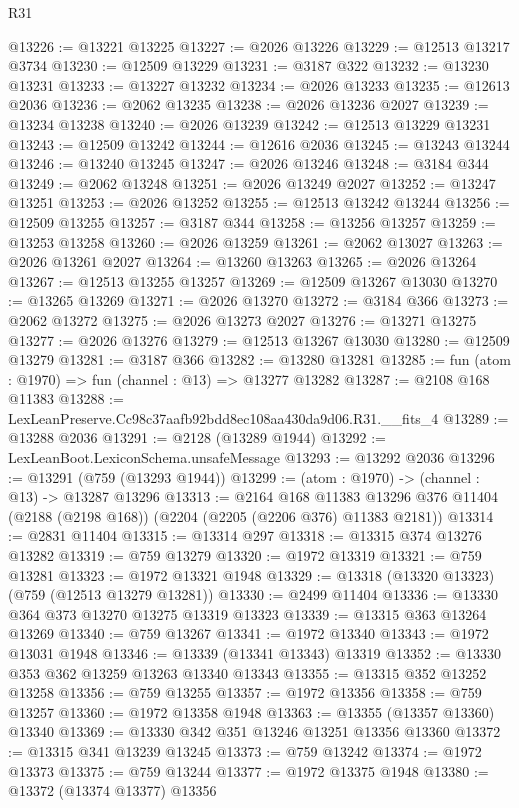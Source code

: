 \begin{lexlean}{R31}
\begin{coremodule}
@13226 := @13221 @13225
@13227 := @2026 @13226
@13229 := @12513 @13217 @3734
@13230 := @12509 @13229
@13231 := @3187 @322
@13232 := @13230 @13231
@13233 := @13227 @13232
@13234 := @2026 @13233
@13235 := @12613 @2036
@13236 := @2062 @13235
@13238 := @2026 @13236 @2027
@13239 := @13234 @13238
@13240 := @2026 @13239
@13242 := @12513 @13229 @13231
@13243 := @12509 @13242
@13244 := @12616 @2036
@13245 := @13243 @13244
@13246 := @13240 @13245
@13247 := @2026 @13246
@13248 := @3184 @344
@13249 := @2062 @13248
@13251 := @2026 @13249 @2027
@13252 := @13247 @13251
@13253 := @2026 @13252
@13255 := @12513 @13242 @13244
@13256 := @12509 @13255
@13257 := @3187 @344
@13258 := @13256 @13257
@13259 := @13253 @13258
@13260 := @2026 @13259
@13261 := @2062 @13027
@13263 := @2026 @13261 @2027
@13264 := @13260 @13263
@13265 := @2026 @13264
@13267 := @12513 @13255 @13257
@13269 := @12509 @13267 @13030
@13270 := @13265 @13269
@13271 := @2026 @13270
@13272 := @3184 @366
@13273 := @2062 @13272
@13275 := @2026 @13273 @2027
@13276 := @13271 @13275
@13277 := @2026 @13276
@13279 := @12513 @13267 @13030
@13280 := @12509 @13279
@13281 := @3187 @366
@13282 := @13280 @13281
@13285 := fun (atom : @1970) => fun (channel : @13) => @13277 @13282
@13287 := @2108 @168 @11383
@13288 := LexLeanPreserve.Cc98c37aafb92bdd8ec108aa430da9d06.R31.__fits_4
@13289 := @13288 @2036
@13291 := @2128 (@13289 @1944)
@13292 := LexLeanBoot.LexiconSchema.unsafeMessage
@13293 := @13292 @2036
@13296 := @13291 (@759 (@13293 @1944))
@13299 := (atom : @1970) -> (channel : @13) -> @13287 @13296
@13313 := @2164
    @168
    @11383
    @13296
    @376
    @11404
    (@2188 (@2198 @168))
    (@2204 (@2205 (@2206 @376) @11383 @2181))
@13314 := @2831 @11404
@13315 := @13314 @297
@13318 := @13315 @374 @13276 @13282
@13319 := @759 @13279
@13320 := @1972 @13319
@13321 := @759 @13281
@13323 := @1972 @13321 @1948
@13329 := @13318 (@13320 @13323) (@759 (@12513 @13279 @13281))
@13330 := @2499 @11404
@13336 := @13330 @364 @373 @13270 @13275 @13319 @13323
@13339 := @13315 @363 @13264 @13269
@13340 := @759 @13267
@13341 := @1972 @13340
@13343 := @1972 @13031 @1948
@13346 := @13339 (@13341 @13343) @13319
@13352 := @13330 @353 @362 @13259 @13263 @13340 @13343
@13355 := @13315 @352 @13252 @13258
@13356 := @759 @13255
@13357 := @1972 @13356
@13358 := @759 @13257
@13360 := @1972 @13358 @1948
@13363 := @13355 (@13357 @13360) @13340
@13369 := @13330 @342 @351 @13246 @13251 @13356 @13360
@13372 := @13315 @341 @13239 @13245
@13373 := @759 @13242
@13374 := @1972 @13373
@13375 := @759 @13244
@13377 := @1972 @13375 @1948
@13380 := @13372 (@13374 @13377) @13356

\end{coremodule}
\end{lexlean}
